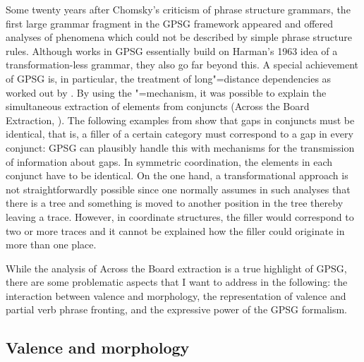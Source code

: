 Some
twenty years after Chomsky's criticism of phrase structure grammars, the first large grammar fragment in the GPSG framework appeared and offered analyses of phenomena
which could not be described by simple phrase structure rules. Although works in GPSG essentially build on Harman's 1963 idea of a transformation-less grammar, they also go far
beyond this. A special achievement of GPSG is, in particular, the treatment of long"=distance dependencies as worked out by \citet{Gazdar81}. By using the \slasch"=mechanism, it
was possible to explain the simultaneous extraction of elements from conjuncts (Across the Board Extraction, \citealp{Ross67}). The following examples from
\citet[]{Gazdar81} show that gaps in conjuncts must be identical, that is, a filler of a certain category must correspond to a gap in every conjunct:
\eal\settowidth{}
\label{ex-atb-gazdar}
\zl
GPSG can plausibly handle this with mechanisms for the transmission of information about gaps. In symmetric coordination, the \slasch elements in each conjunct have
to be identical. On the one hand,
a transformational approach is not straightforwardly possible since
one normally assumes in such analyses that there is a tree and something is moved to another
position in the tree thereby leaving a trace. However, in coordinate structures, the filler would
correspond to two or more traces and it cannot be explained how the filler could originate in more
than one place.

While the analysis of Across the Board extraction is a true highlight of GPSG, there are some problematic
aspects that I want to address in the following: the interaction between valence and morphology,
the representation of valence and partial verb phrase fronting, and the expressive power of the GPSG
formalism. 

\subsection{Valence and morphology}

